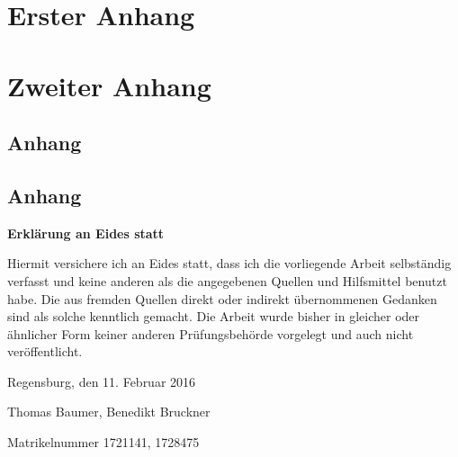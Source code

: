 \documentclass[11pt,a4paper,german,notitlepage]{report}
\newcommand{\authorname}{Thomas Baumer, Benedikt Bruckner}
\newcommand{\matrikelnr}{1721141, 1728475}
\newcommand{\abgabedatum}{11. Februar 2016}
\begin{document}

\chapter{Erster Anhang}
\label{chap:anhang_1}

\chapter{Zweiter Anhang}
\label{chap:anhang_2}

\section{Anhang}
\label{sec:anhang_2_1}

\section{Anhang}
\label{sec:anhang_2_2}

\clearpage

{}



\clearpage

%
%
%

\thispagestyle{empty}
\label{erklaerung}

\setlength{\parindent}{0em}

\textbf{\large{Erklärung an Eides statt}}

\vspace*{20pt}
Hiermit versichere ich an Eides statt, dass ich die vorliegende Arbeit selbständig verfasst und keine anderen als die angegebenen Quellen und Hilfsmittel benutzt habe. Die aus fremden Quellen direkt oder indirekt übernommenen Gedanken sind als solche kenntlich gemacht. Die Arbeit wurde bisher in gleicher oder ähnlicher Form keiner anderen Prüfungsbehörde vorgelegt und auch nicht veröffentlicht.

\vspace*{65pt}


Regensburg, den \abgabedatum

\vspace*{60pt}


\authorname

Matrikelnummer \matrikelnr
\end{document}
